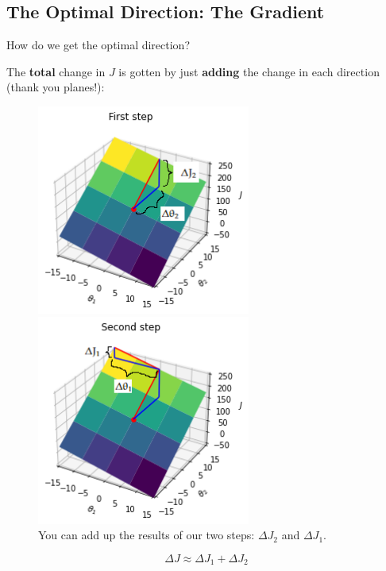     \subsection*{The Optimal Direction: The Gradient}
    
        How do we get the optimal direction?
        
        The \textbf{total} change in $J$ is gotten by just \textbf{adding} the change in each direction (thank you planes!):
        
        \begin{figure}[H]
        
                \includegraphics[width=70mm,scale=0.5]{images/gradient_descent_images/first_step.png}
                
                \includegraphics[width=70mm,scale=0.5]{images/gradient_descent_images/second_step.png}
                
            \caption*{You can add up the results of our two steps: $\Delta J_2$ and $\Delta J_1$.}
        \end{figure}
        
        \begin{equation}
            \Delta J \approx \Delta J_1 + \Delta J_2
        \end{equation}
        
